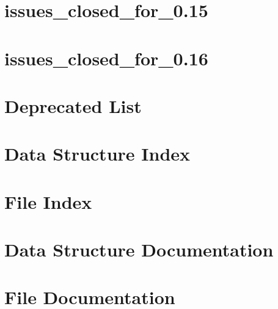 \let\mypdfximage\pdfximage\def\pdfximage{\immediate\mypdfximage}\documentclass[twoside]{book}
\newcommand{\+}{\discretionary{\mbox{\scriptsize$\hookleftarrow$}}{}{}}
\newcommand{\clearemptydoublepage}{%
  \newpage{\pagestyle{empty}\cleardoublepage}%
}
\begin{document}
\chapter{issues\+\_\+closed\+\_\+for\+\_\+0.15}
\label{md_src_libs_external_json_c_issues_closed_for_0_15}

\chapter{issues\+\_\+closed\+\_\+for\+\_\+0.16}
\label{md_src_libs_external_json_c_issues_closed_for_0_16}

\chapter{Deprecated List}
\label{deprecated}

\chapter{Data Structure Index}

\chapter{File Index}

\chapter{Data Structure Documentation}














\chapter{File Documentation}






























\backmatter
\newpage
{}
\clearemptydoublepage
{}
\printindex
\end{document}
